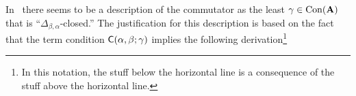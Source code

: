 In~\cite[p.~930]{MR1358491} there seems to be a description of the
commutator as the least $\gamma\in \operatorname{Con} (\mathbf{A})$ that is ``$\Delta_{\beta,\alpha}$-closed.''
The justification for this description
is based on the fact that the term condition $\mathsf{C}(\alpha, \beta; \gamma)$ implies
the following derivation\footnote{In this notation, the stuff below the horizontal line
  is a consequence of the stuff above the horizontal line.}
